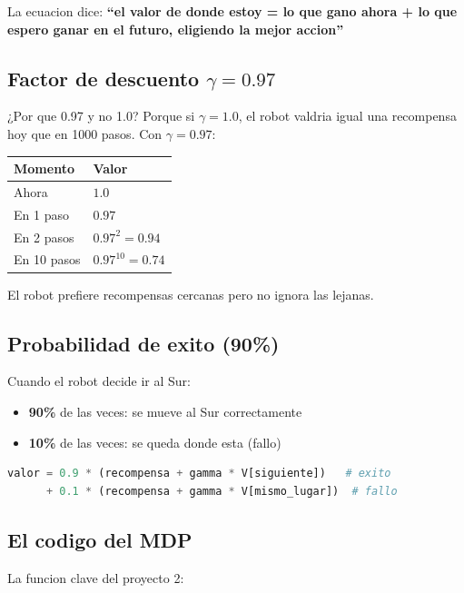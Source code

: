 \documentclass[11pt,a4paper]{article}
\begin{document}
La ecuacion dice: \textbf{``el valor de donde estoy = lo que gano ahora + lo que espero ganar en el futuro, eligiendo la mejor accion''}

\subsection{Factor de descuento $\gamma = 0.97$}

¿Por que 0.97 y no 1.0? Porque si $\gamma = 1.0$, el robot valdria igual una recompensa hoy que en 1000 pasos. Con $\gamma = 0.97$:

\begin{center}
\begin{tabular}{l l}
\toprule
\rowcolor{tabheader}
Momento & Valor \\
\midrule
Ahora & $1.0$ \\
En 1 paso & $0.97$ \\
En 2 pasos & $0.97^2 = 0.94$ \\
En 10 pasos & $0.97^{10} = 0.74$ \\
\bottomrule
\end{tabular}
\end{center}

El robot prefiere recompensas cercanas pero no ignora las lejanas.

\subsection{Probabilidad de exito (90\%)}

Cuando el robot decide ir al Sur:
\begin{itemize}
    \item \textbf{90\%} de las veces: se mueve al Sur correctamente
    \item \textbf{10\%} de las veces: se queda donde esta (fallo)
\end{itemize}

\begin{lstlisting}[language=Python]
valor = 0.9 * (recompensa + gamma * V[siguiente])   # exito
      + 0.1 * (recompensa + gamma * V[mismo_lugar])  # fallo
\end{lstlisting}

\newpage
\subsection{El codigo del MDP}

La funcion clave del proyecto 2:
\end{document}
